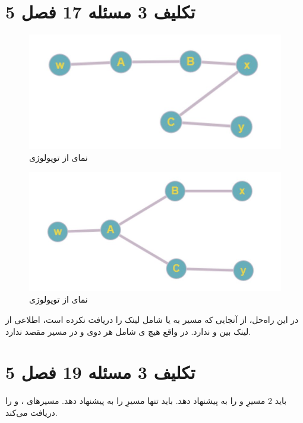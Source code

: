 \documentclass{article}
\begin{document}
\section{تکلیف 3 مسئله 17 فصل 5}
\begin{figure}[H]
    \centering
    \includegraphics[width=1.0\textwidth]{figures/a.jpg}
    \caption
	{
نمای  از توپولوژی
	}
    \label{fig:fig1}
\end{figure}
\begin{figure}[H]
    \centering
    \includegraphics[width=1.0\textwidth]{figures/b.jpg}
    \caption
	{
نمای  از توپولوژی
	}
    \label{fig:fig1}
\end{figure}
در این راه‌حل، از آنجایی که   مسیر به  یا  شامل لینک  را دریافت نکرده است، اطلاعی از لینک بین  و  ندارد. در واقع  هیچ ی شامل هر دوی  و  در مسیر مقصد ندارد.

\section{تکلیف 3 مسئله 19 فصل 5}
 باید 2 مسیرِ  و  را به  پیشنهاد دهد.
\newline
{} باید تنها مسیرِ  را به  پیشنهاد دهد.
\newline
{} مسیرهای ،  و  را دریافت می‌کند.
\end{document}
